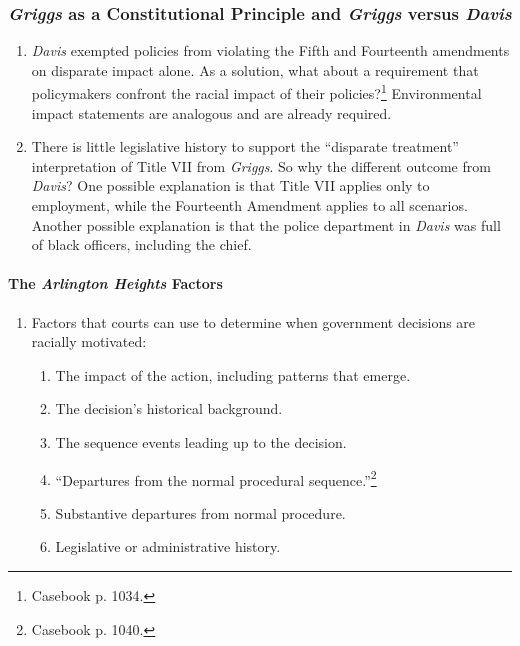 \subsubsection{\emph{Griggs} as a Constitutional Principle and \emph{Griggs} 
versus \emph{Davis}}

\begin{enumerate}
    \item \emph{Davis} exempted policies from violating the Fifth and 
    Fourteenth amendments on disparate impact alone. As a solution, what about 
    a requirement that policymakers confront the racial impact of their 
    policies?\footnote{Casebook p. 1034.} Environmental impact statements are 
    analogous and are already required.
    \item There is little legislative history to support the ``disparate 
    treatment'' interpretation of Title VII from \emph{Griggs}. So why the 
    different outcome from \emph{Davis}? One possible explanation is that 
    Title VII applies only to employment, while the Fourteenth Amendment 
    applies to all scenarios. Another possible explanation is that the police 
    department in \emph{Davis} was full of black officers, including the 
    chief.
\end{enumerate}

\paragraph{The \emph{Arlington Heights} Factors}

\begin{enumerate}
    \item Factors that courts can use to determine when government decisions 
    are racially motivated:
    \begin{enumerate}
        \item The impact of the action, including patterns that emerge.
        \item The decision's historical background.
        \item The sequence events leading up to the decision.
        \item ``Departures from the normal procedural 
        sequence.''\footnote{Casebook p. 1040.}
        \item Substantive departures from normal procedure.
        \item Legislative or administrative history.
    \end{enumerate}
\end{enumerate}
 
